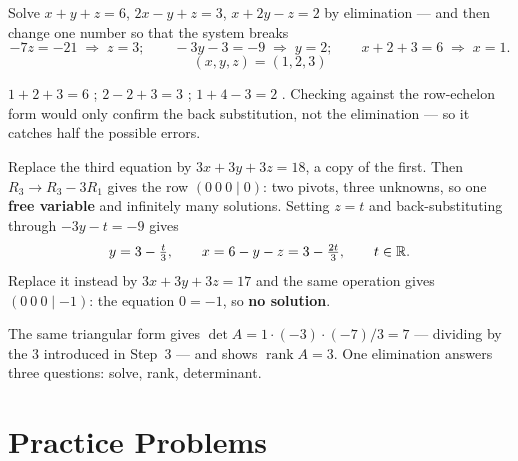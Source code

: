 \begin{worked}{Solve $x+y+z=6$, $2x-y+z=3$, $x+2y-z=2$ by elimination --- and then change one number so that the system breaks}
\[
  -7z=-21\;\Rightarrow\;z=3;\qquad
  -3y-3=-9\;\Rightarrow\;y=2;\qquad
  x+2+3=6\;\Rightarrow\;x=1 .
\]
\[
  \boxed{(x,y,z)=(1,2,3)}
\]

$1+2+3=6$ \checkmark;\; $2-2+3=3$ \checkmark;\; $1+4-3=2$ \checkmark.
Checking against the row-echelon form would only confirm the back
substitution, not the elimination --- so it catches half the possible
errors.

Replace the third equation by $3x+3y+3z=18$, a copy of the first. Then
$R_{3}\to R_{3}-3R_{1}$ gives the row $(0\ 0\ 0\mid0)$: two pivots, three
unknowns, so one \textbf{free variable} and infinitely many solutions.
Setting $z=t$ and back-substituting through $-3y-t=-9$ gives
\[
  y=3-\tfrac{t}{3},\qquad x=6-y-z=3-\tfrac{2t}{3},\qquad t\in\mathbb{R} .
\]
Replace it instead by $3x+3y+3z=17$ and the same operation gives
$(0\ 0\ 0\mid-1)$: the equation $0=-1$, so \textbf{no solution}.

The same triangular form gives $\det A=1\cdot(-3)\cdot(-7)/3=7$ --- dividing
by the $3$ introduced in Step~3 --- and shows $\operatorname{rank}A=3$. One
elimination answers three questions: solve, rank, determinant.
\end{worked}

\section{Practice Problems}

